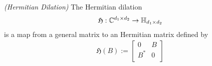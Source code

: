 \begin{definition}
  \emph{(Hermitian Dilation)}
  The Hermitian dilation
  \begin{gather*}
    \mathfrak{H} : \mathbb{C}^{d_1 \times d_2} \to \mathbb{H}_{d_1 \times d_2}
  \end{gather*}
  is a map from a general matrix to an Hermitian matrix defined by
  \begin{gather}
    \label{ rmineq_hermitian_dilation } 
    \mathfrak{H}(B)
    :=
    \begin{bmatrix}
      0   & B \\
      B^* & 0 \\
    \end{bmatrix}
  \end{gather}
\end{definition}
